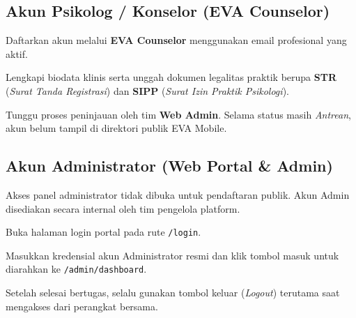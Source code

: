 \subsection{Akun Psikolog / Konselor (EVA Counselor)}
\begin{steplist}
  \item Daftarkan akun melalui \textbf{EVA Counselor} menggunakan email profesional yang aktif.
  \item Lengkapi biodata klinis serta unggah dokumen legalitas praktik berupa \textbf{STR} (\textit{Surat Tanda Registrasi}) dan \textbf{SIPP} (\textit{Surat Izin Praktik Psikologi}).
  \item Tunggu proses peninjauan oleh tim \textbf{Web Admin}. Selama status masih \textit{Antrean}, akun belum tampil di direktori publik EVA Mobile.
\end{steplist}

\subsection{Akun Administrator (Web Portal \& Admin)}
Akses panel administrator tidak dibuka untuk pendaftaran publik. Akun Admin disediakan secara internal oleh tim pengelola platform.
\begin{steplist}
  \item Buka halaman login portal pada rute \texttt{/login}.
  \item Masukkan kredensial akun Administrator resmi dan klik tombol masuk untuk diarahkan ke \texttt{/admin/dashboard}.
  \item Setelah selesai bertugas, selalu gunakan tombol keluar (\textit{Logout}) terutama saat mengakses dari perangkat bersama.
\end{steplist}

